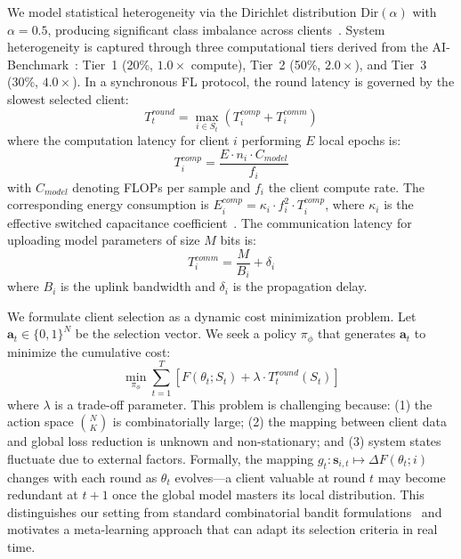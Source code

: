 \documentclass[journal]{IEEEtran}
\begin{document}
We model statistical heterogeneity via the Dirichlet distribution $\text{Dir}(\alpha)$ with $\alpha = 0.5$, producing significant class imbalance across clients~\cite{hsu2019measuring}. System heterogeneity is captured through three computational tiers derived from the AI-Benchmark~\cite{ignatov2018ai}: Tier~1 (20\%, $1.0\times$ compute), Tier~2 (50\%, $2.0\times$), and Tier~3 (30\%, $4.0\times$). In a synchronous FL protocol, the round latency is governed by the slowest selected client:
\begin{equation}
	T_t^{round} = \max_{i \in S_t} \left(T_i^{comp} + T_i^{comm}\right)
	\label{eq:round_latency}
\end{equation}
where the computation latency for client $i$ performing $E$ local epochs is:
\begin{equation}
	T_i^{comp} = \frac{E \cdot n_i \cdot C_{model}}{f_i}
	\label{eq:comp_latency}
\end{equation}
with $C_{model}$ denoting FLOPs per sample and $f_i$ the client compute rate. The corresponding energy consumption is $E_i^{comp} = \kappa_i \cdot f_i^2 \cdot T_i^{comp}$, where $\kappa_i$ is the effective switched capacitance coefficient~\cite{yang2021energy}. The communication latency for uploading model parameters of size $M$ bits is:
\begin{equation}
	T_i^{comm} = \frac{M}{B_i} + \delta_i
	\label{eq:comm_latency}
\end{equation}
where $B_i$ is the uplink bandwidth and $\delta_i$ is the propagation delay.

We formulate client selection as a dynamic cost minimization problem. Let $\bm{a}_t \in \{0,1\}^N$ be the selection vector. We seek a policy $\pi_\phi$ that generates $\bm{a}_t$ to minimize the cumulative cost:
\begin{equation}
	\min_{\pi_\phi} \sum_{t=1}^{T} \left[ F(\theta_t; S_t) + \lambda \cdot T_t^{round}(S_t) \right]
	\label{eq:bi_objective}
\end{equation}
where $\lambda$ is a trade-off parameter. This problem is challenging because: (1) the action space $\binom{N}{K}$ is combinatorially large; (2) the mapping between client data and global loss reduction is unknown and non-stationary; and (3) system states fluctuate due to external factors. Formally, the mapping $g_t: \bm{s}_{i,t} \mapsto \Delta F(\theta_t; i)$ changes with each round as $\theta_t$ evolves---a client valuable at round $t$ may become redundant at $t+1$ once the global model masters its local distribution. This distinguishes our setting from standard combinatorial bandit formulations~\cite{pan2024contextual} and motivates a meta-learning approach that can adapt its selection criteria in real time.
\end{document}
